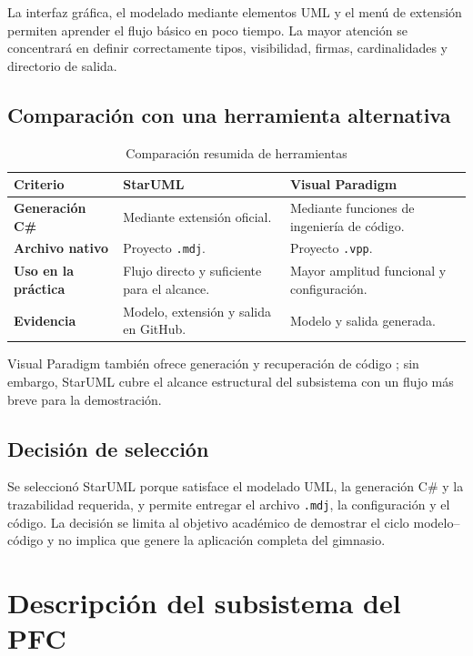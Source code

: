 \documentclass[12pt,a4paper]{article}
\begin{document}
La interfaz gráfica, el modelado mediante elementos UML y el menú de extensión
permiten aprender el flujo básico en poco tiempo. La mayor atención se
concentrará en definir correctamente tipos, visibilidad, firmas,
cardinalidades y directorio de salida.

\subsection{Comparación con una herramienta alternativa}

\begin{table}[htbp]
  \centering
  \caption{Comparación resumida de herramientas}
  \label{tab:comparacion-herramientas}
  \footnotesize
  \begin{tabularx}{\textwidth}{>{\bfseries}p{2.7cm}XX}
    \toprule
    Criterio & StarUML & Visual Paradigm \\
    \midrule
    Generación C\# & Mediante extensión oficial. & Mediante funciones de ingeniería de código. \\
    Archivo nativo & Proyecto \texttt{.mdj}. & Proyecto \texttt{.vpp}. \\
    Uso en la práctica & Flujo directo y suficiente para el alcance. & Mayor amplitud funcional y configuración. \\
    Evidencia & Modelo, extensión y salida en GitHub. & Modelo y salida generada. \\
    \bottomrule
  \end{tabularx}
\end{table}

Visual Paradigm también ofrece generación y recuperación de código
\cite{visualParadigm2026}; sin embargo, StarUML cubre el alcance estructural
del subsistema con un flujo más breve para la demostración.

\subsection{Decisión de selección}

Se seleccionó StarUML porque satisface el modelado UML, la generación C\# y la
trazabilidad requerida, y permite entregar el archivo \texttt{.mdj}, la
configuración y el código. La decisión se limita al objetivo académico de
demostrar el ciclo modelo--código y no implica que genere la aplicación
completa del gimnasio.


\section{Descripción del subsistema del PFC}
\end{document}
